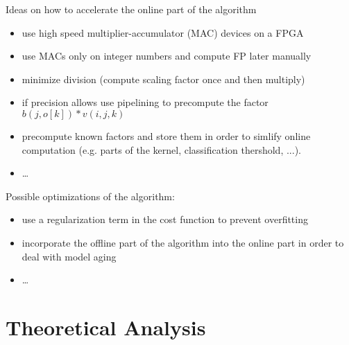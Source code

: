 \documentclass[mscthesis]{usiinfthesis}
\begin{document}
Ideas on how to accelerate the online part of the algorithm
\begin{itemize}
    \item use high speed multiplier-accumulator (MAC) devices on a FPGA
    \item use MACs only on integer numbers and compute FP later manually
    \item minimize division (compute scaling factor once and then multiply)
    \item if precision allows use pipelining to precompute the factor
        $ b(j, o[k]) * v(i, j, k) $
    \item precompute known factors and store them in order to simlify online
        computation (e.g. parts of the kernel, classification thershold, ...).
    \item \dots
\end{itemize}

Possible optimizations of the algorithm:
\begin{itemize}
    \item use a regularization term in the cost function to prevent overfitting
    \item incorporate the offline part of the algorithm into the online part in
        order to deal with model aging
    \item \dots
\end{itemize}
\section{Theoretical Analysis}
\end{document}
